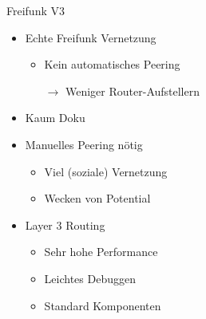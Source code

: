 \begin{frame}{Freifunk V3}
    \begin{itemize}
        \item Echte Freifunk Vernetzung
        \begin{itemize}
            \item Kein automatisches Peering
            \item[$\rightarrow$] Weniger Router-Aufstellern
        \end{itemize}
        \item Kaum Doku
        \item Manuelles Peering nötig
        \begin{itemize}
            \item Viel (soziale) Vernetzung
            \item Wecken von Potential
        \end{itemize}
        \item Layer 3 Routing
        \begin{itemize}
            \item Sehr hohe Performance
            \item Leichtes Debuggen
            \item Standard Komponenten
        \end{itemize}
    \end{itemize}
\end{frame}
